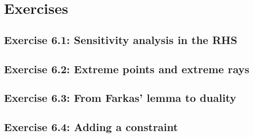 \vfill


\pagebreak	

\section{Exercises}

\subsection*{Exercise 6.1: Sensitivity analysis in the RHS}


\subsection*{Exercise 6.2: Extreme points and extreme rays}


\subsection*{Exercise 6.3: From Farkas' lemma to duality}


\subsection*{Exercise 6.4: Adding a constraint}








